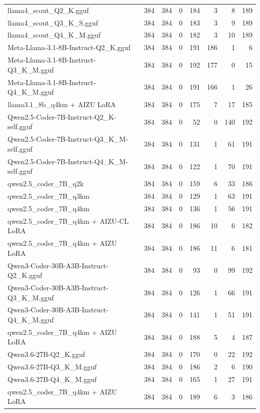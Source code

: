 \begin{table}[htbp]
{\begin{tabular}{lrrrrrrr}
    llama4\_scout\_Q2\_K.gguf & 384 & 384 & 0 & 184 & 3 & 8 & 189 \\
    llama4\_scout\_Q3\_K\_S.gguf & 384 & 384 & 0 & 183 & 3 & 9 & 189 \\
    llama4\_scout\_Q4\_K\_M.gguf & 384 & 384 & 0 & 182 & 3 & 10 & 189 \\
    Meta-Llama-3.1-8B-Instruct-Q2\_K.gguf & 384 & 384 & 0 & 191 & 186 & 1 & 6 \\
    Meta-Llama-3.1-8B-Instruct-Q3\_K\_M.gguf & 384 & 384 & 0 & 192 & 177 & 0 & 15 \\
    Meta-Llama-3.1-8B-Instruct-Q4\_K\_M.gguf & 384 & 384 & 0 & 191 & 166 & 1 & 26 \\
    llama3.1\_8b\_q4km + AIZU LoRA & 384 & 384 & 0 & 175 & 7 & 17 & 185 \\
    Qwen2.5-Coder-7B-Instruct-Q2\_K-self.gguf & 384 & 384 & 0 & 52 & 0 & 140 & 192 \\
    Qwen2.5-Coder-7B-Instruct-Q3\_K\_M-self.gguf & 384 & 384 & 0 & 131 & 1 & 61 & 191 \\
    Qwen2.5-Coder-7B-Instruct-Q4\_K\_M-self.gguf & 384 & 384 & 0 & 122 & 1 & 70 & 191 \\
    qwen2.5\_coder\_7B\_q2k & 384 & 384 & 0 & 159 & 6 & 33 & 186 \\
    qwen2.5\_coder\_7B\_q3km & 384 & 384 & 0 & 129 & 1 & 63 & 191 \\
    qwen2.5\_coder\_7B\_q4km & 384 & 384 & 0 & 136 & 1 & 56 & 191 \\
    qwen2.5\_coder\_7B\_q4km + AIZU-CL LoRA & 384 & 384 & 0 & 186 & 10 & 6 & 182 \\
    qwen2.5\_coder\_7B\_q4km + AIZU LoRA & 384 & 384 & 0 & 186 & 11 & 6 & 181 \\
    Qwen3-Coder-30B-A3B-Instruct-Q2\_K.gguf & 384 & 384 & 0 & 93 & 0 & 99 & 192 \\
    Qwen3-Coder-30B-A3B-Instruct-Q3\_K\_M.gguf & 384 & 384 & 0 & 126 & 1 & 66 & 191 \\
    Qwen3-Coder-30B-A3B-Instruct-Q4\_K\_M.gguf & 384 & 384 & 0 & 141 & 1 & 51 & 191 \\
    qwen2.5\_coder\_7B\_q4km + AIZU LoRA & 384 & 384 & 0 & 188 & 5 & 4 & 187 \\
    Qwen3.6-27B-Q2\_K.gguf & 384 & 384 & 0 & 170 & 0 & 22 & 192 \\
    Qwen3.6-27B-Q3\_K\_M.gguf & 384 & 384 & 0 & 186 & 2 & 6 & 190 \\
    Qwen3.6-27B-Q4\_K\_M.gguf & 384 & 384 & 0 & 165 & 1 & 27 & 191 \\
    qwen2.5\_coder\_7B\_q4km + AIZU LoRA & 384 & 384 & 0 & 189 & 6 & 3 & 186 \\

\end{tabular}}
\end{table}
